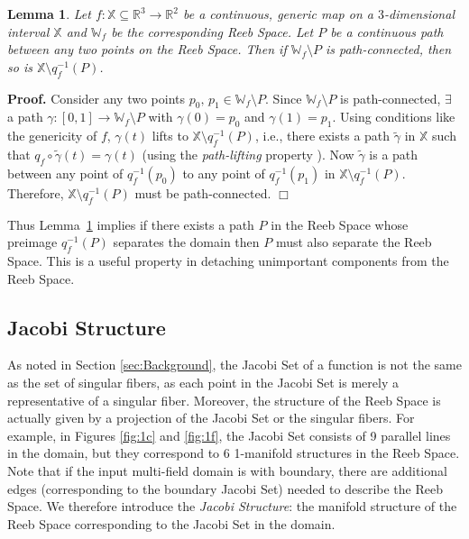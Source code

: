 \documentclass[twocolumn]{article}
\newtheorem{lemma}[theorem]{Lemma}
\newcommand{\X}{\mathbb{X}}
\newcommand{\RS}{\mathbb{W}_f}
\newcommand{\twofigref}[2]{Figures \ref{fig:#1} and \ref{fig:#2}}
\renewenvironment{proof}{{\bf Proof. }}{\hspace*{\fill}$\Box$\bigskip\noindent}
\begin{document}
\begin{lemma}
\label{lem:path}
Let $f:\mathbb{X}\subseteq \mathbb{R}^3\rightarrow \mathbb{R}^2$ be a continuous, generic map on a $3$-dimensional interval $\mathbb{X}$  and
$\RS$ be the corresponding Reeb Space. Let $P$ be a
continuous path between any two points on the Reeb Space. Then
if $\RS \setminus P$ is path-connected, then so
is $\mathbb{X}\setminus q_f^{-1}(P)$.
\end{lemma}
\noindent
\begin{proof}
Consider any two points $p_0,\,p_1\in \RS \setminus
P$. Since $\RS \setminus P$ is path-connected, $\exists$ a path
$\gamma: [0, 1]\rightarrow \RS \setminus P$ with $\gamma(0)=p_0$ and
$\gamma(1)=p_1$.  Using conditions like
the genericity of $f$, $\gamma(t)$ lifts to $\X \setminus q_f^{-1}(P)$,
i.e., there exists a path $\tilde{\gamma}$ in
$\X$ such that $q_f \circ \tilde{\gamma}(t) = \gamma(t)$ (using the
\emph{path-lifting} property \cite{2002-Hatcher}).
Now $\tilde{\gamma}$ is a path between any point of $q_f^{-1}(p_0)$ to any point
of $q_f^{-1}(p_1)$ in $\mathbb{X}\setminus q_f^{-1}(P)$. Therefore, $\mathbb{X}\setminus q_f^{-1}(P)$ must be path-connected.
\end{proof}

\noindent
Thus Lemma~\ref{lem:path} implies if there
exists a path $P$ in the Reeb Space whose preimage $q_f^{-1}(P)$ separates
the domain then $P$ must also separate the Reeb Space. This is a 
useful property in detaching unimportant components from the Reeb Space.

\subsection{Jacobi Structure}
\label{subsec:Jacobi}
As noted in Section \ref{sec:Background}, the Jacobi Set of a function is not the same as the set of singular fibers, as each 
point in the Jacobi Set is merely a representative of a singular fiber. Moreover, the structure of 
the Reeb Space is actually given by a projection of the Jacobi Set or 
the singular fibers. For example, in 
\twofigref{1c}{1f}, the Jacobi Set consists of 9 parallel lines in the domain, but
they correspond to 6 1-manifold structures in the Reeb Space. 
Note that if the input multi-field domain is with boundary, there are
additional edges (corresponding to the boundary
 Jacobi Set) needed to describe the Reeb Space.
We therefore introduce the \emph{Jacobi Structure}: the 
manifold structure of the Reeb Space corresponding to the Jacobi Set
in the domain.
\end{document}
